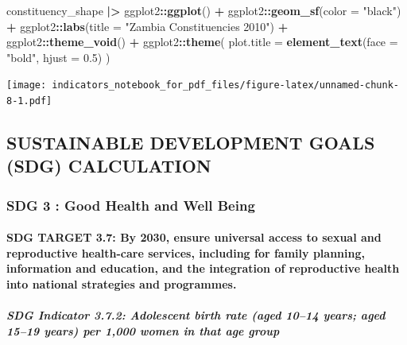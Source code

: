 \documentclass[
]{article}
\newenvironment{Shaded}{\begin{snugshade}}{\end{snugshade}}
\newcommand{\AttributeTok}[1]{\textcolor[rgb]{0.13,0.29,0.53}{#1}}
\newcommand{\FloatTok}[1]{\textcolor[rgb]{0.00,0.00,0.81}{#1}}
\newcommand{\FunctionTok}[1]{\textcolor[rgb]{0.13,0.29,0.53}{\textbf{#1}}}
\newcommand{\NormalTok}[1]{#1}
\newcommand{\SpecialCharTok}[1]{\textcolor[rgb]{0.81,0.36,0.00}{\textbf{#1}}}
\newcommand{\StringTok}[1]{\textcolor[rgb]{0.31,0.60,0.02}{#1}}
\newenvironment{UNFPAShadedBox}{%
\begin{tcolorbox}[sharp corners, enhanced, colback=white, boxrule=0pt, borderline west={2pt}{0pt}{orange}]%
}{\end{tcolorbox}}
\newenvironment{Highlighting}{\begin{UNFPAShadedBox}}{\end{UNFPAShadedBox}}
\begin{document}
\begin{Shaded}
\begin{Highlighting}[]
\NormalTok{constituency\_shape }\SpecialCharTok{|\textgreater{}}
\NormalTok{  ggplot2}\SpecialCharTok{::}\FunctionTok{ggplot}\NormalTok{() }\SpecialCharTok{+}
\NormalTok{  ggplot2}\SpecialCharTok{::}\FunctionTok{geom\_sf}\NormalTok{(}\AttributeTok{color =} \StringTok{"black"}\NormalTok{) }\SpecialCharTok{+}
\NormalTok{  ggplot2}\SpecialCharTok{::}\FunctionTok{labs}\NormalTok{(}\AttributeTok{title =} \StringTok{"Zambia Constituencies 2010"}\NormalTok{) }\SpecialCharTok{+}
\NormalTok{  ggplot2}\SpecialCharTok{::}\FunctionTok{theme\_void}\NormalTok{() }\SpecialCharTok{+}
\NormalTok{  ggplot2}\SpecialCharTok{::}\FunctionTok{theme}\NormalTok{(}
    \AttributeTok{plot.title =} \FunctionTok{element\_text}\NormalTok{(}\AttributeTok{face =} \StringTok{"bold"}\NormalTok{, }\AttributeTok{hjust =} \FloatTok{0.5}\NormalTok{)}
\NormalTok{  )}
\end{Highlighting}
\end{Shaded}

\texttt{[image: indicators\_notebook\_for\_pdf\_files/figure-latex/unnamed-chunk-8-1.pdf]}

\subsection{SUSTAINABLE DEVELOPMENT GOALS (SDG)
CALCULATION}\label{sustainable-development-goals-sdg-calculation}

\subsubsection{SDG 3 : Good Health and Well
Being}\label{sdg-3-good-health-and-well-being}

\paragraph{SDG TARGET 3.7: By 2030, ensure universal access to sexual
and reproductive health-care services, including for family planning,
information and education, and the integration of reproductive health
into national strategies and
programmes.}\label{sdg-target-3.7-by-2030-ensure-universal-access-to-sexual-and-reproductive-health-care-services-including-for-family-planning-information-and-education-and-the-integration-of-reproductive-health-into-national-strategies-and-programmes.}

\subparagraph{\texorpdfstring{\textbf{SDG Indicator 3.7.2: Adolescent
birth rate (aged 10--14 years; aged 15--19 years) per 1,000 women in
that age
group}}{SDG Indicator 3.7.2: Adolescent birth rate (aged 10--14 years; aged 15--19 years) per 1,000 women in that age group}}\label{sdg-indicator-3.7.2-adolescent-birth-rate-aged-1014-years-aged-1519-years-per-1000-women-in-that-age-group}
\end{document}
